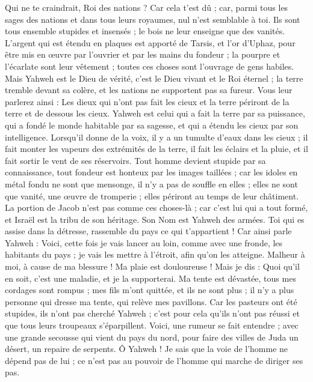 \begin{multicols}{2}
Qui ne te craindrait, Roi des nations ? Car cela t'est dû ; car, parmi tous les sages des nations et dans tous leurs royaumes, nul n'est semblable à toi.
Ils sont tous ensemble stupides et insensés ; le bois ne leur enseigne que des vanités.
L'argent qui est étendu en plaques est apporté de Tarsis, et l'or d'Uphaz, pour être mis en œuvre par l'ouvrier et par les mains du fondeur ; la pourpre et l'écarlate sont leur vêtement ; toutes ces choses sont l'ouvrage de gens habiles.
Mais Yahweh est le Dieu de vérité, c'est le Dieu vivant et le Roi éternel ; la terre tremble devant sa colère, et les nations ne supportent pas sa fureur.
Vous leur parlerez ainsi : Les dieux qui n'ont pas fait les cieux et la terre périront de la terre et de dessous les cieux.
Yahweh est celui qui a fait la terre par sa puissance, qui a fondé le monde habitable par sa sagesse, et qui a étendu les cieux par son intelligence.
Lorsqu'il donne de la voix, il y a un tumulte d'eaux dans les cieux ; il fait monter les vapeurs des extrémités de la terre, il fait les éclairs et la pluie, et il fait sortir le vent de ses réservoirs.
Tout homme devient stupide par sa connaissance, tout fondeur est honteux par les images taillées ; car les idoles en métal fondu ne sont que mensonge, il n'y a pas de souffle en elles ;
elles ne sont que vanité, une œuvre de tromperie ; elles périront au temps de leur châtiment.
La portion de Jacob n'est pas comme ces choses-là ; car c'est lui qui a tout formé, et Israël est la tribu de son héritage. Son Nom est Yahweh des armées.
Toi qui es assise dans la détresse, rassemble du pays ce qui t'appartient !
Car ainsi parle Yahweh : Voici, cette fois je vais lancer au loin, comme avec une fronde, les habitants du pays ; je vais les mettre à l'étroit, afin qu'on les atteigne.
Malheur à moi, à cause de ma blessure ! Ma plaie est douloureuse ! Mais je dis : Quoi qu'il en soit, c'est une maladie, et je la supporterai.
Ma tente est dévastée, tous mes cordages sont rompus ; mes fils m'ont quittée, et ils ne sont plus ; il n'y a plus personne qui dresse ma tente, qui relève mes pavillons.
Car les pasteurs ont été stupides, ils n'ont pas cherché Yahweh ; c'est pour cela qu'ils n'ont pas réussi et que tous leurs troupeaux s'éparpillent.
Voici, une rumeur se fait entendre ; avec une grande secousse qui vient du pays du nord, pour faire des villes de Juda un désert, un repaire de serpents.
Ô Yahweh ! Je sais que la voie de l'homme ne dépend pas de lui ; ce n'est pas au pouvoir de l'homme qui marche de diriger ses pas.

\end{multicols}
